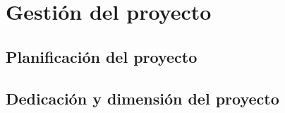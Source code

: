 \chapter{Gestión del proyecto}

\section{Planificación del proyecto}


\section{Dedicación y dimensión del proyecto}


